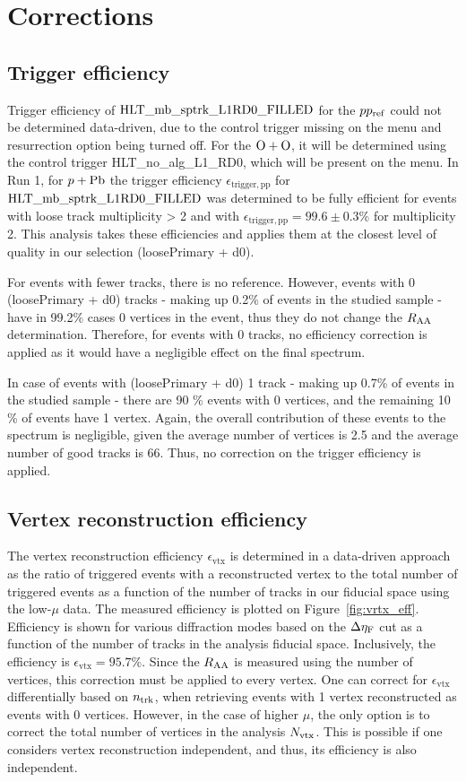 \chapter{Corrections}
\label{chap:corr}

\section{Trigger efficiency}
Trigger efficiency of $\text{HLT\_mb\_sptrk\_L1RD0\_FILLED}$ for the $pp_{\mathrm{ref}}$ could not be determined data-driven, due to the control trigger missing on the menu and resurrection option being turned off. For the $\OO$, it will be determined using the control trigger HLT\_no\_alg\_L1\_RD0, which will be present on the menu. In Run 1, for $\pPb$ \cite{pPb_mbsptrk_trigger} the trigger efficiency $\epsilon_{\mathrm{trigger, pp}}$ for $\text{HLT\_mb\_sptrk\_L1RD0\_FILLED}$ was determined to be fully efficient for events with loose track multiplicity > 2 and with $\epsilon_{\mathrm{trigger, pp}} = 99.6\pm0.3\%$ for multiplicity 2. This analysis takes these efficiencies and applies them at the closest level of quality in our selection (loosePrimary + d0).

For events with fewer tracks, there is no reference. However, events with 0 (loosePrimary + d0) tracks - making up 0.2\% of events in the studied sample - have in 99.2\% cases 0 vertices in the event, thus they do not change the $\RAA$ determination. Therefore, for events with 0 tracks, no efficiency correction is applied as it would have a negligible effect on the final spectrum.

In case of events with (loosePrimary + d0) 1 track - making up 0.7\% of events in the studied sample - there are 90 \% events with 0 vertices, and the remaining 10 \% of events have 1 vertex. Again, the overall contribution of these events to the spectrum is negligible, given the average number of vertices is 2.5 and the average number of good tracks is 66. Thus, no correction on the trigger efficiency is applied.

\section{Vertex reconstruction efficiency}
The vertex reconstruction efficiency $\epsilon_{\mathrm{vtx}}$ is determined in a data-driven approach as the ratio of triggered events with a reconstructed vertex to the total number of triggered events as a function of the number of tracks in our fiducial space using the low-$\mu$ data. The measured efficiency is plotted on Figure~\ref{fig:vrtx_eff}. Efficiency is shown for various diffraction modes based on the $\Delta \eta_{\mathrm{F}}$ cut as a function of the number of tracks in the analysis fiducial space. Inclusively, the efficiency is $\epsilon_{\mathrm{vtx}} = 95.7\%$. Since the $\RAA$ is measured using the number of vertices, this correction must be applied to every vertex. One can correct for $\epsilon_{\mathrm{vtx}}$ differentially based on $n_\text{trk}$, when retrieving events with 1 vertex reconstructed as events with 0 vertices. However, in the case of higher $\mu$, the only option is to correct the total number of vertices in the analysis $N_\text{vtx}$. This is possible if one considers vertex reconstruction independent, and thus, its efficiency is also independent. 

